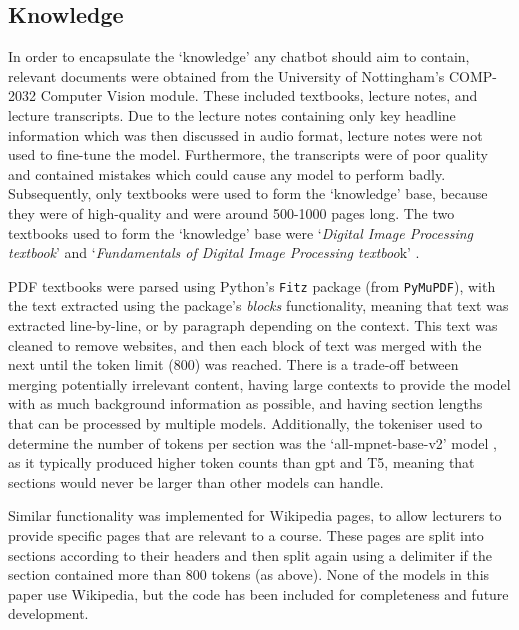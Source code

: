 \subsection{Knowledge}\label{sec:methodology_knowledge}
In order to encapsulate the `knowledge' any chatbot should aim to contain, relevant documents were obtained from the University of Nottingham's COMP-2032 Computer Vision module. These included textbooks, lecture notes, and lecture transcripts. Due to the lecture notes containing only key headline information which was then discussed in audio format, lecture notes were not used to fine-tune the model. Furthermore, the transcripts were of poor quality and contained mistakes which could cause any model to perform badly. Subsequently, only textbooks were used to form the `knowledge' base, because they were of high-quality and were around 500-1000 pages long. The two textbooks used to form the `knowledge' base were `\textit{Digital Image Processing textbook}' \citep{gonzalez2018digital} and `\textit{Fundamentals of Digital Image Processing textboo}k' \citep{solomon2010fundamentals}.

PDF textbooks were parsed using Python's \texttt{Fitz} package (from \texttt{PyMuPDF}), with the text extracted using the package's \textit{blocks} functionality, meaning that text was extracted line-by-line, or by paragraph depending on the context. This text was cleaned to remove websites, and then each block of text was merged with the next until the token limit (800) was reached. There is a trade-off between merging potentially irrelevant content, having large contexts to provide the model with as much background information as possible, and having section lengths that can be processed by multiple models. Additionally, the tokeniser used to determine the number of tokens per section was the `all-mpnet-base-v2' model \citep{huggingface_tokeniser_model}, as it typically produced higher token counts than \acrshort{gpt} and T5, meaning that sections would never be larger than other models can handle.

Similar functionality was implemented for Wikipedia pages, to allow lecturers to provide specific pages that are relevant to a course. These pages are split into sections according to their headers and then split again using a delimiter if the section contained more than 800 tokens (as above). None of the models in this paper use Wikipedia, but the code has been included for completeness and future development.

